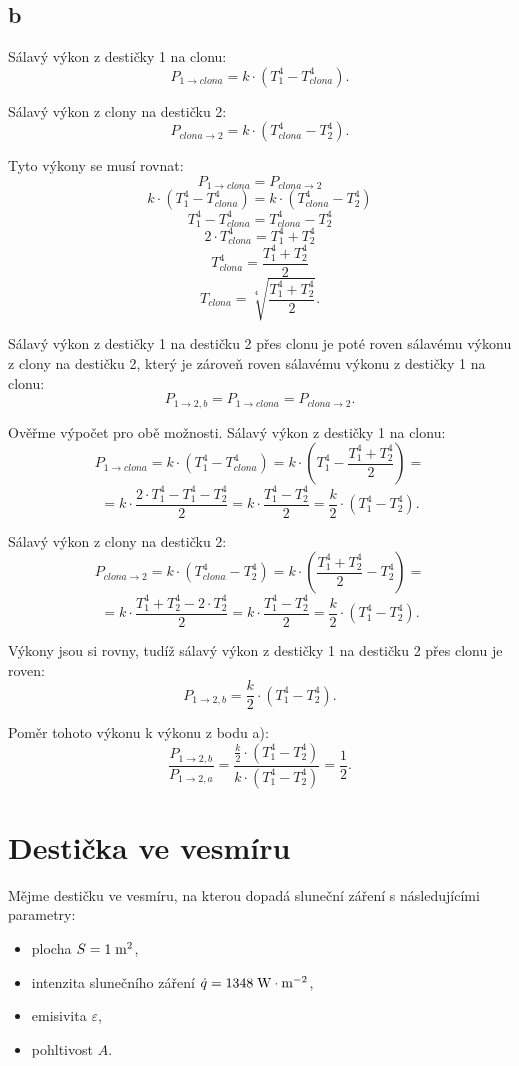 \documentclass{article}
\begin{document}
\subsection{b}
Sálavý výkon z destičky 1 na clonu:
$$
    P_{1 \rightarrow clona} = k \cdot \left( T_1^4 - T_{clona}^4 \right).
$$

Sálavý výkon z clony na destičku 2:
$$
    P_{clona \rightarrow 2} = k \cdot \left( T_{clona}^4 - T_2^4 \right).
$$

Tyto výkony se musí rovnat:
$$
    P_{1 \rightarrow clona} = P_{clona \rightarrow 2}
$$
$$
    k \cdot \left( T_1^4 - T_{clona}^4 \right) = k \cdot \left( T_{clona}^4 - T_2^4 \right)
$$
$$
    T_1^4 - T_{clona}^4 = T_{clona}^4 - T_2^4
$$
$$
    2 \cdot T_{clona}^4 = T_1^4 + T_2^4
$$
$$
    T_{clona}^4 = \frac{T_1^4 + T_2^4}{2}
$$
$$
    T_{clona} = \sqrt[4]{\frac{T_1^4 + T_2^4}{2}}.
$$

Sálavý výkon z destičky 1 na destičku 2 přes clonu je poté roven sálavému výkonu z clony na destičku 2, který je zároveň roven sálavému výkonu z destičky 1 na clonu:
$$
    P_{1 \rightarrow 2,b} = P_{1 \rightarrow clona} = P_{clona \rightarrow 2}.
$$

Ověřme výpočet pro obě možnosti. Sálavý výkon z destičky 1 na clonu:
$$
    P_{1 \rightarrow clona} = k \cdot \left( T_1^4 - T_{clona}^4 \right) = k \cdot \left( T_1^4 - \frac{T_1^4 + T_2^4}{2} \right) =
$$
$$
    = k \cdot \frac{2 \cdot T_1^4 - T_1^4 - T_2^4}{2} = k \cdot \frac{T_1^4 - T_2^4}{2} = \frac{k}{2} \cdot \left( T_1^4 - T_2^4 \right).
$$

Sálavý výkon z clony na destičku 2:
$$
    P_{clona \rightarrow 2} = k \cdot \left( T_{clona}^4 - T_2^4 \right) = k \cdot \left( \frac{T_1^4 + T_2^4}{2} - T_2^4 \right) =
$$
$$
    = k \cdot \frac{T_1^4 + T_2^4 - 2 \cdot T_2^4}{2} = k \cdot \frac{T_1^4 - T_2^4}{2} = \frac{k}{2} \cdot \left( T_1^4 - T_2^4 \right).
$$

Výkony jsou si rovny, tudíž sálavý výkon z destičky 1 na destičku 2 přes clonu je roven:
$$
    P_{1 \rightarrow 2,b} = \frac{k}{2} \cdot \left( T_1^4 - T_2^4 \right).
$$

Poměr tohoto výkonu k výkonu z bodu a):
$$
    \frac{P_{1 \rightarrow 2,b}}{P_{1 \rightarrow 2,a}} = \frac{\frac{k}{2} \cdot \left( T_1^4 - T_2^4 \right)}{k \cdot \left( T_1^4 - T_2^4 \right)} = \frac{1}{2}.
$$

\newpage




\section{ Destička ve vesmíru \spicy \spicy}
Mějme destičku ve vesmíru, na kterou dopadá sluneční záření s následujícími parametry:
\begin{itemize}
    \item plocha $S = 1 \; \textrm{m}^{\textrm{2}}$,
    \item intenzita slunečního záření $\dot{q} = 1348 \; \textrm{W} \cdot \textrm{m}^{-2}$,
    \item emisivita $\varepsilon$,
    \item pohltivost $A$.
\end{itemize}
\end{document}
